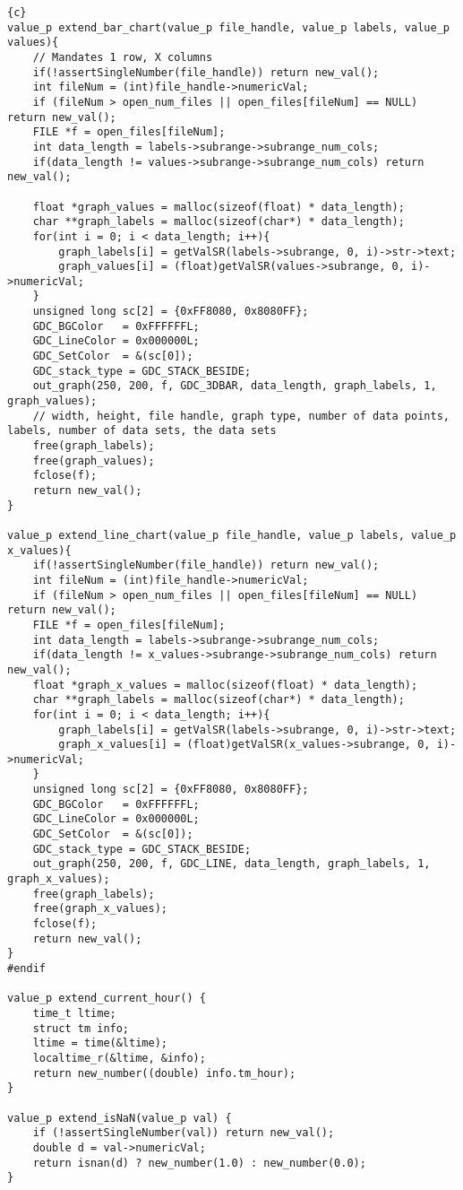 \begin{lstlisting}{c}
value_p extend_bar_chart(value_p file_handle, value_p labels, value_p values){
	// Mandates 1 row, X columns
	if(!assertSingleNumber(file_handle)) return new_val();
	int fileNum = (int)file_handle->numericVal;
	if (fileNum > open_num_files || open_files[fileNum] == NULL)  return new_val();
	FILE *f = open_files[fileNum];
	int data_length = labels->subrange->subrange_num_cols;
	if(data_length != values->subrange->subrange_num_cols) return new_val();

	float *graph_values = malloc(sizeof(float) * data_length);
	char **graph_labels = malloc(sizeof(char*) * data_length);
	for(int i = 0; i < data_length; i++){
		graph_labels[i] = getValSR(labels->subrange, 0, i)->str->text;
		graph_values[i] = (float)getValSR(values->subrange, 0, i)->numericVal;
	}
	unsigned long sc[2] = {0xFF8080, 0x8080FF};
	GDC_BGColor   = 0xFFFFFFL;
	GDC_LineColor = 0x000000L;
	GDC_SetColor  = &(sc[0]);
	GDC_stack_type = GDC_STACK_BESIDE;
	out_graph(250, 200, f, GDC_3DBAR, data_length, graph_labels, 1, graph_values);
	// width, height, file handle, graph type, number of data points, labels, number of data sets, the data sets
	free(graph_labels);
	free(graph_values);
	fclose(f);
	return new_val();
}

value_p extend_line_chart(value_p file_handle, value_p labels, value_p x_values){
	if(!assertSingleNumber(file_handle)) return new_val();
	int fileNum = (int)file_handle->numericVal;
	if (fileNum > open_num_files || open_files[fileNum] == NULL)  return new_val();
	FILE *f = open_files[fileNum];
	int data_length = labels->subrange->subrange_num_cols;
	if(data_length != x_values->subrange->subrange_num_cols) return new_val();
	float *graph_x_values = malloc(sizeof(float) * data_length);
	char **graph_labels = malloc(sizeof(char*) * data_length);
	for(int i = 0; i < data_length; i++){
		graph_labels[i] = getValSR(labels->subrange, 0, i)->str->text;
		graph_x_values[i] = (float)getValSR(x_values->subrange, 0, i)->numericVal;
	}
	unsigned long sc[2] = {0xFF8080, 0x8080FF};
	GDC_BGColor   = 0xFFFFFFL;
	GDC_LineColor = 0x000000L;
	GDC_SetColor  = &(sc[0]);
	GDC_stack_type = GDC_STACK_BESIDE;
	out_graph(250, 200, f, GDC_LINE, data_length, graph_labels, 1, graph_x_values);
	free(graph_labels);
	free(graph_x_values);
	fclose(f);
	return new_val();
}
#endif

value_p extend_current_hour() {
	time_t ltime;
	struct tm info;
	ltime = time(&ltime);
	localtime_r(&ltime, &info);
	return new_number((double) info.tm_hour);
}

value_p extend_isNaN(value_p val) {
	if (!assertSingleNumber(val)) return new_val();
	double d = val->numericVal;
	return isnan(d) ? new_number(1.0) : new_number(0.0);
}


\end{lstlisting}
